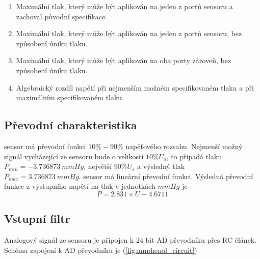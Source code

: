 \begin{table}[H]
\begin{ctucolortab}
    \end{ctucolortab}
    \begin{enumerate}
        \item \label{enum:amp_proof_pressure} Maximální tlak, který může být aplikován na jeden z portů sensoru a zachoval původní specifikace.
        \item \label{enum:amp_burst_pressure} Maximální tlak, který může být aplikován na jeden z portů sensoru, bez způsobení úniku tlaku.
        \item \label{enum:amp_common_pressure} Maximální tlak, který může být aplikován na oba porty zároveň, bez způsobení úniku tlaku.
        \item \label{enum:amp_fss} Algebraický rozdíl napětí při nejmenším možném specifikovaném tlaku a při maximálním specifikovaném tlaku.
    \end{enumerate}
\end{table}
\subsection{Převodní charakteristika}
sensor má převodní funkci $10 \% - 90 \%$ napěťového rozsahu. Nejmenší možný signál vycházející ze sensoru bude o velikosti $10\% U_s$,
to připadá tlaku $P_{min} = -3.736873 \ mmHg$, největší $90\% U_s$ a výsledný tlak $P_{max} = 3.736873 \ mmHg$. sensor má lineární převodní funkci.
Výsledná převodní funkce z výstupního napětí na tlak v jednotkách $mmHg$ je
\begin{equation}
    P = 2.831 \times U - 4.6711
\end{equation}
\subsection{Vstupní filtr}
Analogový signál ze sensoru je připojen k 24 bit AD převodníku přes RC článek. Schéma zapojení k AD převodníku je (\ref{fig:amphenol_circuit})

